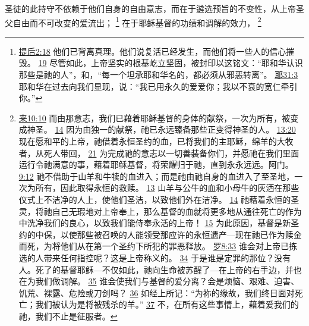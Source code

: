 \documentclass[12pt, a4paper, oneside]{ctexart}
\newcounter{parnum}[section]
\newcommand{\N}{%
   \noindent\refstepcounter{parnum}%
    \makebox[\parindent][l]{\textbf{\arabic{parnum}.}}}
\begin{document}
\N 圣徒的此持守不依赖于他们自身的自由意志，而在于遴选预旨的不变性，从上帝圣父自由而不可改变的爱流出；
	\footnote {
		\href{https://biblehub.com/2_timothy/2-18.htm}{提后2:18} 他们已背离真理。他们说复活已经发生，而他们将一些人的信心摧毁。
		\href{https://biblehub.com/2_timothy/2-19.htm}{19} 尽管如此，上帝坚实的根基屹立坚固，被封印以这铭文：“耶和华认识那些是祂的人”，和，“每一个坦承耶和华名的，都必须从邪恶转离”。
		\href{https://biblehub.com/jeremiah/31-3.htm}{耶31:3} 耶和华在过去向我们显现，说：“我已用永久的爱爱你；我以不衰的宽仁牵引你。”
	}
	在于耶稣基督的功绩和调解的效力，
	\footnote {
		\href{https://biblehub.com/hebrews/10-10.htm}{来10:10} 而由那意志，我们已藉着耶稣基督的身体的献祭，一次为所有，被变成神圣。
		\href{https://biblehub.com/hebrews/10-14.htm}{14} 因为由独一的献祭，祂已永远臻备那些正变得神圣的人。
		\href{https://biblehub.com/hebrews/13-20.htm}{13:20} 现在愿和平的上帝，祂借着永恒圣约的血，已将我们的主耶稣，绵羊的大牧者，从死人带回，
		\href{https://biblehub.com/hebrews/13-21.htm}{21} 为完成祂的意志以一切善装备你们，并愿祂在我们里面运行令祂满意的事，藉着耶稣基督，将荣耀归于祂，直到永永远远。阿门。
		\href{https://biblehub.com/hebrews/9-12.htm}{9:12} 祂不借助于山羊和牛犊的血进入；而是祂由祂自身的血进入了至圣地，一次为所有，因此取得永恒的救赎。
		\href{https://biblehub.com/hebrews/9-13.htm}{13} 山羊与公牛的血和小母牛的灰洒在那些仪式上不洁净的人上，使他们圣洁，以致他们外在洁净。
		\href{https://biblehub.com/hebrews/9-14.htm}{14} 祂藉着永恒的圣灵，将祂自己无瑕地对上帝奉上，那么基督的血就将更多地从通往死亡的作为中洗净我们的良心，以致我们能侍奉永活的上帝！
		\href{https://biblehub.com/hebrews/9-15.htm}{15} 为此原因，基督是新圣约的中保，以使那些被召唤的人能领受那应许的永恒遗产---现在祂已作为赎金而死，为将他们从在第一个圣约下所犯的罪恶释放。
		\href{https://biblehub.com/romans/8-33.htm}{罗8:33} 谁会对上帝已拣选的人带来任何指控呢？这是上帝称义的。
		\href{https://biblehub.com/romans/8-34.htm}{34} 于是谁是定罪的那位？没有人。死了的基督耶稣---不仅如此，祂向生命被苏醒了---在上帝的右手边，并也在为我们做调解。
		\href{https://biblehub.com/romans/8-35.htm}{35} 谁会使我们与基督的爱分离？会是烦恼、艰难、迫害、饥荒、裸露、危险或刀剑吗？
		\href{https://biblehub.com/romans/8-36.htm}{36} 如经上所记：“为祢的缘故，我们终日面对死亡；我们被认为是将被残杀的羊。”
		\href{https://biblehub.com/romans/8-37.htm}{37} 不，在所有这些事情上，藉着爱我们的祂，我们不止是征服者。
}
\end{document}
